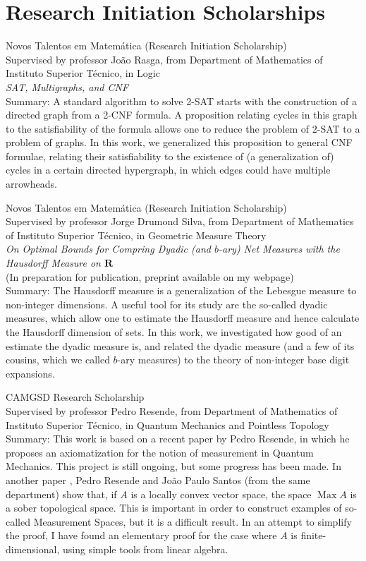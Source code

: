 \documentclass[11pt]{article} %
\begin{document}
\section*{Research Initiation Scholarships}

 Novos Talentos em Matemática (Research Initiation Scholarship)\\
Supervised by professor João Rasga, from Department of Mathematics of Instituto Superior Técnico, in Logic\\
\textit{SAT, Multigraphs, and CNF}\\
Summary: A standard algorithm to solve 2-SAT starts with the construction of a directed graph from a 2-CNF formula. A proposition relating cycles in this graph to the satisfiability of the formula allows one to reduce the problem of 2-SAT to a problem of graphs. In this work, we generalized this proposition to general CNF formulae, relating their satisfiability to the existence of (a generalization of) cycles in a certain directed hypergraph, in which edges could have multiple arrowheads.
\medskip

 Novos Talentos em Matemática (Research Initiation Scholarship)\\
Supervised by professor Jorge Drumond Silva, from Department of Mathematics of Instituto Superior Técnico, in Geometric Measure Theory\\
\textit{On Optimal Bounds for Compring Dyadic (and $b$-ary) Net Measures with the Hausdorff Measure on $\mathbf{R}$}\\
(In preparation for publication, preprint available on my webpage)\\
Summary: The Hausdorff measure is a generalization of the Lebesgue measure to non-integer dimensions. A useful tool for its study are the so-called dyadic measures, which allow one to estimate the Hausdorff measure and hence calculate the Hausdorff dimension of sets. In this work, we investigated how good of an estimate the dyadic measure is, and related the dyadic measure (and a few of its cousins, which we called $b$-ary measures) to the theory of non-integer base digit expansions.
\medskip

 CAMGSD Research Scholarship\\
Supervised by professor Pedro Resende, from Department of Mathematics of Instituto Superior Técnico, in Quantum Mechanics and Pointless Topology\\
Summary: This work is based on a recent paper \cite{measurement} by Pedro Resende, in which he proposes an axiomatization for the notion of measurement in Quantum Mechanics. This project is still ongoing, but some progress has been made. In another paper \cite{prjps}, Pedro Resende and João Paulo Santos (from the same department) show that, if $A$ is a locally convex vector space, the space $\mathop{\mathrm{Max}} A$ is a sober topological space. This is important in order to construct examples of so-called Measurement Spaces, but it is a difficult result. In an attempt to simplify the proof, I have found an elementary proof for the case where $A$ is finite-dimensional, using simple tools from linear algebra.
\end{document}
